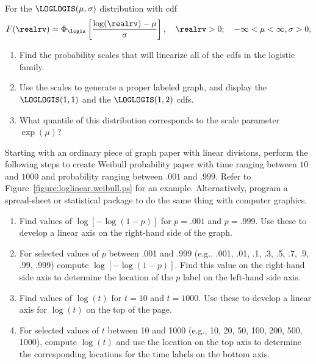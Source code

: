 \begin{exercise}
For the $\LOGLOGIS(\mu, \sigma)$ distribution
with cdf 	 
\begin{displaymath}
F(\realrv)=\Phi_{\logis} \left [
\frac{\log(\realrv)-\mu}{\sigma}
\right ], \quad \realrv > 0; \quad -\infty< \mu <\infty, \sigma
> 0,  	 
\end{displaymath} 	 
\begin{enumerate} 	 
\item 	 
Find the probability scales that will linearize all of the cdfs
in the logistic family.
\item
Use the scales to generate a proper labeled graph, and display the
$\LOGLOGIS(1, 1)$ and the $\LOGLOGIS(1, 2)$ cdfs.
\item 
What quantile of this distribution corresponds to the scale
parameter $\exp(\mu)$?
\end{enumerate}
\end{exercise}

\begin{exercise}
Starting with an ordinary piece of graph paper with linear divisions,
perform the following steps to create Weibull probability paper with
time ranging between $10$ and $1000$ and probability ranging between
$.001$ and $.999.$ Refer to Figure~\ref{figure:loglinear.weibull.ps} 
for an example. Alternatively, program a spread-sheet or statistical 
package to do the same thing with computer graphics.
\begin{enumerate}
\item
Find values of $\log[-\log(1-p)]$ for $p=.001$ and $p=.999.$ Use these
to develop a linear axis on the right-hand side of the graph.
\item
For selected values of $p$ between .001 and .999 (e.g., .001,
.01, .1, .3, .5, .7, .9, .99, .999) compute $\log[-\log(1-p)].$ Find
this value on the right-hand side axis to determine the location of
the $p$ label on the left-hand side axis.
\item
Find values of $\log(t)$ for $t=10$ and $t=1000.$ Use these to develop
a linear axis for $\log(t)$ on the top of the page.
\item
For selected values of $t$ between 10 and 1000 (e.g., 10, 20, 50,
100, 200, 500, 1000), compute $\log(t)$ and use the location on the
top axis to determine the corresponding locations for the time labels
on the bottom axis.
\end{enumerate}
\end{exercise}

